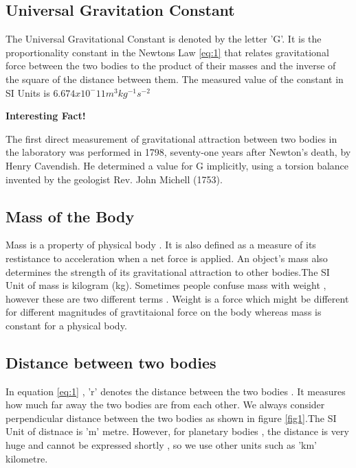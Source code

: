 \documentclass[a4paper, 12pt]{article}
\begin{document}
\subsection*{Universal Gravitation Constant}
The Universal Gravitational Constant is denoted by the letter 'G'. It is the proportionality constant in the Newtons Law \ref{eq:1} that relates gravitational force between the two bodies to the product of their masses and the inverse of the square of the distance between them. The measured value of the constant in SI Units is $ 6.674x10^-11 m^3 kg^{-1} s^{-2} $ \par
\textbf{\bfseries \large Interesting Fact!} \par
The first direct measurement of gravitational attraction between two bodies in the laboratory was performed in 1798, seventy-one years after Newton's death, by Henry Cavendish. He determined a value for G implicitly, using a torsion balance invented by the geologist Rev. John Michell (1753).
\subsection*{Mass of the Body}
 Mass is a property of physical body . It is also defined as a measure of its restistance to acceleration when a net force is 
applied. An object's mass also determines the strength of its gravitational attraction to other bodies.The SI Unit of mass is kilogram (kg). 
Sometimes people confuse mass with weight , however these are two different terms . Weight is a force which might be different for different magnitudes of gravtitaional force on the body whereas mass is constant for a physical body.
\subsection*{Distance between two bodies}
In equation \ref{eq:1} , 'r' denotes the distance between the two bodies . It measures how much far away the two bodies are from each other.
We always consider perpendicular distance between the two bodies as shown in figure \ref{fig1}.The SI Unit of distnace is 'm' metre.
However, for planetary bodies , the distance is very huge and cannot be expressed shortly , so we use other units such as 'km' kilometre. 
\end{document}
